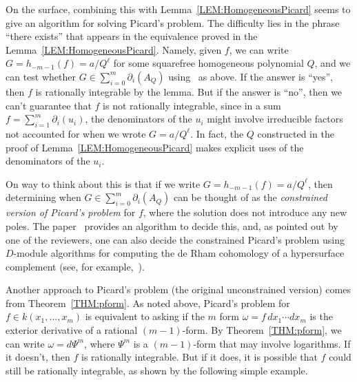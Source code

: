 \documentclass{amsart}
\theoremstyle{definition}
\numberwithin{equation}{section}
\numberwithin{thm}{section}
\begin{document}
On the surface, combining this with Lemma~\ref{LEM:HomogeneousPicard} seems to give an algorithm for solving Picard's problem.  
The difficulty lies in the phrase ``there exists'' that appears in the equivalence proved in the Lemma~\ref{LEM:HomogeneousPicard}.  Namely, given $f$, we can write $G = h_{-m-1}(f) = a/Q^\ell$ for some squarefree homogeneous polynomial $Q$, and we can test whether $G \in \sum_{i=0}^m \partial_i(A_Q)$ using~\cite{Lairez2016} as above. If the answer is ``yes'', then $f$ is rationally integrable by the lemma.  But if the answer is ``no'', then we can't guarantee that $f$ is not rationally integrable, since in a sum $f = \sum_{i=1}^m \partial_i(u_i)$, the denominators of the $u_i$ might involve irreducible factors not accounted for when we wrote $G = a/Q^\ell$.  In fact, the $Q$ constructed in the proof of Lemma~\ref{LEM:HomogeneousPicard} makes explicit uses of the denominators of the $u_i$.

On way to think about this is that if we write $G = h_{-m-1}(f) = a/Q^\ell$, then determining when $G \in \sum_{i=0}^m \partial_i(A_Q)$ can be thought of as the \textit{constrained version of Picard's problem} for $f$, where the solution does not introduce any new poles.  The paper~\cite{Lairez2016} provides an algorithm to decide this, and, as pointed out by one of the reviewers, one can also decide the constrained Picard's problem using $D$-module algorithms for computing the de Rham cohomology of a hypersurface complement (see, for example,~\cite{OakuTakayama1999}). 
 


Another approach to Picard's problem (the original unconstrained version) comes from Theorem~\ref{THM:pform}.  As noted above, Picard's problem for $f \in k(x_1,\dots,x_m)$ is equivalent to asking if the $m$ form $\omega = f\,dx_1\cdots dx_m$ is the exterior derivative of a rational $(m-1)$-form.  By Theorem~\ref{THM:pform}, we can write $\omega = d\Psi^m$, where $\Psi^m$ is a $(m-1)$-form that may involve logarithms.  If it doesn't, then $f$ is rationally integrable.  But if it does, it is possible that $f$ could still be rationally integrable, as shown by the following simple example. 
\end{document}
